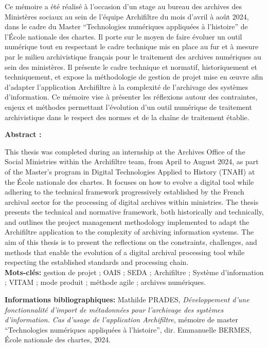 \documentclass[a4paper,12pt,twoside]{book}
\begin{document}
	
	Ce mémoire a été réalisé à l'occasion d'un stage au bureau des archives des Ministères sociaux au sein de l’équipe Archifiltre du mois d'avril à août 2024, dans le cadre du Master \enquote{Technologies numériques appliquées à l'histoire} de l'École nationale des chartes. Il porte sur le moyen de faire évoluer un outil numérique tout en respectant le cadre technique mis en place au fur et à mesure par le milieu archivistique français pour le traitement des archives numériques au sein des ministères. Il présente le cadre technique et normatif, historiquement et techniquement, et expose la méthodologie de gestion de projet mise en œuvre afin d’adapter l’application Archifiltre à la complexité de l’archivage des systèmes d’information. Ce mémoire vise à présenter les réflexions autour des contraintes, enjeux et méthodes permettant l’évolution d’un outil numérique de traitement archivistique dans le respect des normes et de la chaîne de traitement établie.
	
	
	\textbf{Abstract : }
	
	
	This thesis was completed during an internship at the Archives Office of the Social Ministries within the Archifiltre team, from April to August 2024, as part of the Master’s program in Digital Technologies Applied to History (TNAH) at the École nationale des chartes. It focuses on how to evolve a digital tool while adhering to the technical framework progressively established by the French archival sector for the processing of digital archives within ministries. The thesis presents the technical and normative framework, both historically and technically, and outlines the project management methodology implemented to adapt the Archifiltre application to the complexity of archiving information systems. The aim of this thesis is to present the reflections on the constraints, challenges, and methods that enable the evolution of a digital archival processing tool while respecting the established standards and processing chain.
	\\
	
	\textbf{Mots-clés:} gestion de projet ; OAIS ; SEDA ; Archifiltre ; Système d'information ; VITAM ; mode produit ; méthode agile ; archives numériques. 
	
	\textbf{Informations bibliographiques:} Mathilde PRADES, \textit{Développement d'une fonctionnalité d'import de métadonnées pour l'archivage des systèmes d'information. Cas d'usage de l'application Archifiltre}, mémoire de master \enquote{Technologies numériques appliquées à l'histoire}, dir. Emmanuelle BERMES, École nationale des chartes, 2024.
	
\end{document}
